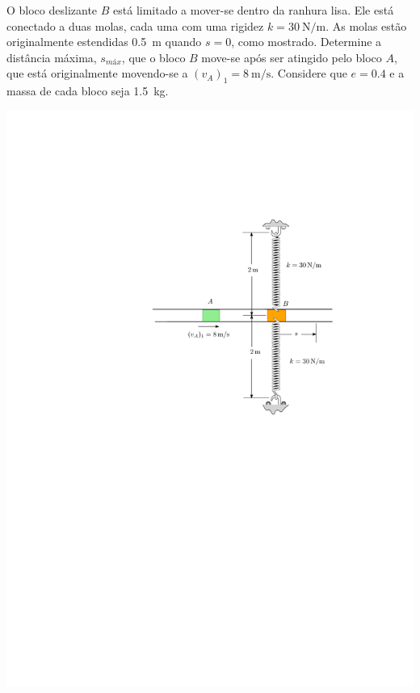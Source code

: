 \item O bloco deslizante $B$ está limitado a mover-se dentro da ranhura lisa. Ele está conectado a duas molas, cada uma com uma rigidez $k=\SI{30}{\newton/\meter}$. As molas estão originalmente estendidas \SI{.5}{\meter} quando $s=0$, como mostrado. Determine a distância máxima, $s_{\textit{máx}}$, que o bloco $B$ move-se após ser atingido pelo bloco $A$, que está originalmente movendo-se a $(v_{A})_{1}=\SI{8}{\meter/\second}$. Considere que $e=0.4$ e a massa de cada bloco seja \SI{1.5}{\kilogram}.

\begin{flushright}
	\includegraphics[scale=1.4]{images/draw_13}
\end{flushright}